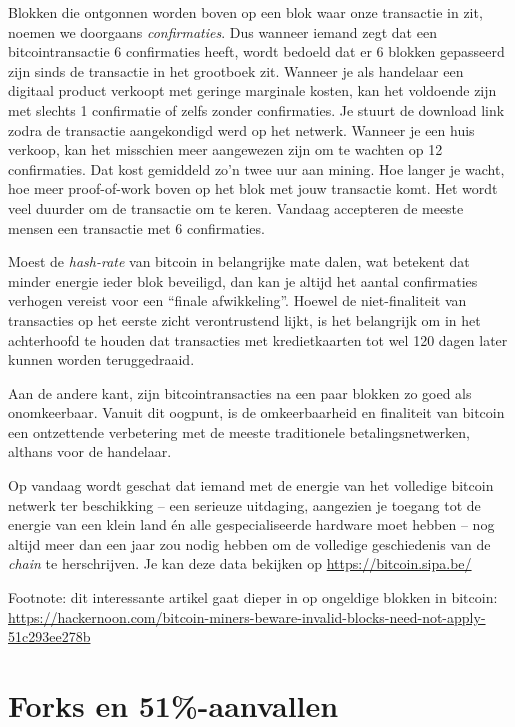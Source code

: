 \documentclass[
  letterpaper,
]{scrbook}
\begin{document}
Blokken die ontgonnen worden boven op een blok waar onze transactie in
zit, noemen we doorgaans \emph{confirmaties}. Dus wanneer iemand zegt
dat een bitcointransactie 6 confirmaties heeft, wordt bedoeld dat er 6
blokken gepasseerd zijn sinds de transactie in het grootboek zit.
Wanneer je als handelaar een digitaal product verkoopt met geringe
marginale kosten, kan het voldoende zijn met slechts 1 confirmatie of
zelfs zonder confirmaties. Je stuurt de download link zodra de
transactie aangekondigd werd op het netwerk. Wanneer je een huis
verkoop, kan het misschien meer aangewezen zijn om te wachten op 12
confirmaties. Dat kost gemiddeld zo'n twee uur aan mining. Hoe langer je
wacht, hoe meer proof-of-work boven op het blok met jouw transactie
komt. Het wordt veel duurder om de transactie om te keren. Vandaag
accepteren de meeste mensen een transactie met 6 confirmaties.

Moest de \emph{hash-rate} van bitcoin in belangrijke mate dalen, wat
betekent dat minder energie ieder blok beveiligd, dan kan je altijd het
aantal confirmaties verhogen vereist voor een ``finale afwikkeling''.
Hoewel de niet-finaliteit van transacties op het eerste zicht
verontrustend lijkt, is het belangrijk om in het achterhoofd te houden
dat transacties met kredietkaarten tot wel 120 dagen later kunnen worden
teruggedraaid.

Aan de andere kant, zijn bitcointransacties na een paar blokken zo goed
als onomkeerbaar. Vanuit dit oogpunt, is de omkeerbaarheid en finaliteit
van bitcoin een ontzettende verbetering met de meeste traditionele
betalingsnetwerken, althans voor de handelaar.

Op vandaag wordt geschat dat iemand met de energie van het volledige
bitcoin netwerk ter beschikking -- een serieuze uitdaging, aangezien je
toegang tot de energie van een klein land én alle gespecialiseerde
hardware moet hebben -- nog altijd meer dan een jaar zou nodig hebben om
de volledige geschiedenis van de \emph{chain} te herschrijven. Je kan
deze data bekijken op \url{https://bitcoin.sipa.be/}

Footnote: dit interessante artikel gaat dieper in op ongeldige blokken
in bitcoin:
\url{https://hackernoon.com/bitcoin-miners-beware-invalid-blocks-need-not-apply-51c293ee278b}

\hypertarget{forks-en-51-aanvallen}{%
\chapter{Forks en 51\%-aanvallen}\label{forks-en-51-aanvallen}}
\end{document}
